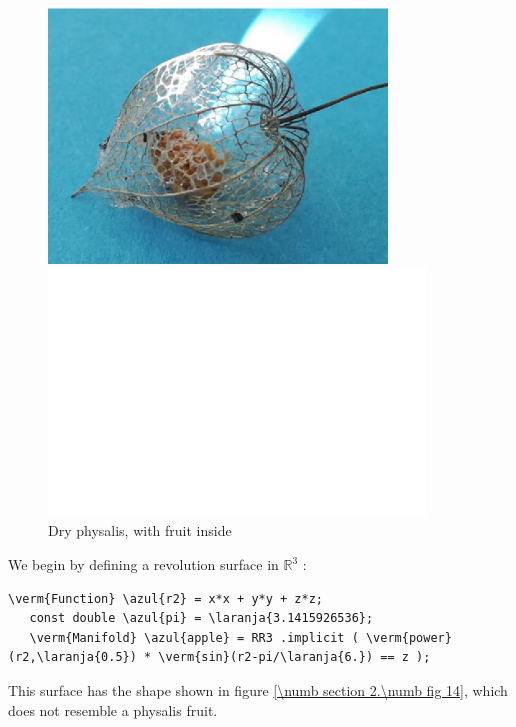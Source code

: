 \begin{figure}[ht]\centering
\if{}
\centerline{\includegraphics[width=90mm]{dry-physalis}}
\else
{}
\centerline{\includegraphics[width=100mm]{fake-physalis}}
\fi
  \caption{Dry physalis, with fruit inside}\label{\numb section 2.\numb fig 13}
\end{figure}

We begin by defining a revolution surface in $ \mathbb{R}^3 $ :

\begin{Verbatim}[commandchars=\\\{\},formatcom=\small\tt,frame=single,
   label=parag-\ref{\numb section 2.\numb parag 13}.cpp,rulecolor=\color{coment},
   baselinestretch=0.94,framesep=2mm]
   \verm{Function} \azul{r2} = x*x + y*y + z*z;
   const double \azul{pi} = \laranja{3.1415926536};
   \verm{Manifold} \azul{apple} = RR3 .implicit ( \verm{power}(r2,\laranja{0.5}) * \verm{sin}(r2-pi/\laranja{6.}) == z );
\end{Verbatim}

This surface has the shape shown in figure \ref{\numb section 2.\numb fig 14},
which does not resemble a physalis fruit.

